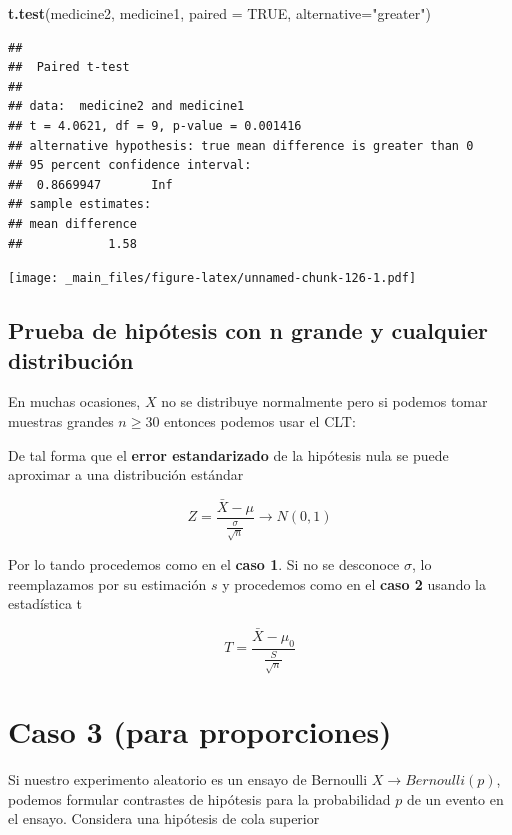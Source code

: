 \documentclass[
]{book}
\newenvironment{Shaded}{\begin{snugshade}}{\end{snugshade}}
\newcommand{\AttributeTok}[1]{\textcolor[rgb]{0.13,0.29,0.53}{#1}}
\newcommand{\ConstantTok}[1]{\textcolor[rgb]{0.56,0.35,0.01}{#1}}
\newcommand{\FunctionTok}[1]{\textcolor[rgb]{0.13,0.29,0.53}{\textbf{#1}}}
\newcommand{\NormalTok}[1]{#1}
\newcommand{\StringTok}[1]{\textcolor[rgb]{0.31,0.60,0.02}{#1}}
\begin{document}
\begin{Shaded}
\begin{Highlighting}[]
\FunctionTok{t.test}\NormalTok{(medicine2, medicine1,}
       \AttributeTok{paired =} \ConstantTok{TRUE}\NormalTok{,}
       \AttributeTok{alternative=}\StringTok{"greater"}\NormalTok{)}
\end{Highlighting}
\end{Shaded}

\begin{verbatim}
## 
##  Paired t-test
## 
## data:  medicine2 and medicine1
## t = 4.0621, df = 9, p-value = 0.001416
## alternative hypothesis: true mean difference is greater than 0
## 95 percent confidence interval:
##  0.8669947       Inf
## sample estimates:
## mean difference 
##            1.58
\end{verbatim}

\texttt{[image: \_main\_files/figure-latex/unnamed-chunk-126-1.pdf]}

\hypertarget{prueba-de-hipuxf3tesis-con-n-grande-y-cualquier-distribuciuxf3n}{%
\subsection{Prueba de hipótesis con n grande y cualquier distribución}\label{prueba-de-hipuxf3tesis-con-n-grande-y-cualquier-distribuciuxf3n}}

En muchas ocasiones, \(X\) no se distribuye normalmente pero si podemos tomar muestras grandes \(n \ge 30\) entonces podemos usar el CLT:

De tal forma que el \textbf{error estandarizado} de la hipótesis nula se puede aproximar a una distribución estándar

\[Z=\frac{\bar{X}-\mu}{\frac{\sigma}{\sqrt{n}}} \rightarrow N(0,1)\]

Por lo tando procedemos como en el \textbf{caso 1}. Si no se desconoce \(\sigma\), lo reemplazamos por su estimación \(s\) y procedemos como en el \textbf{caso 2} usando la estadística t

\[T=\frac{\bar{X}-\mu_0}{\frac{S}{\sqrt{n}}}\]

\hypertarget{caso-3-para-proporciones}{%
\section{Caso 3 (para proporciones)}\label{caso-3-para-proporciones}}

Si nuestro experimento aleatorio es un ensayo de Bernoulli \(X \rightarrow Bernoulli(p)\), podemos formular contrastes de hipótesis para la probabilidad \(p\) de un evento en el ensayo. Considera una hipótesis de cola superior
\end{document}
